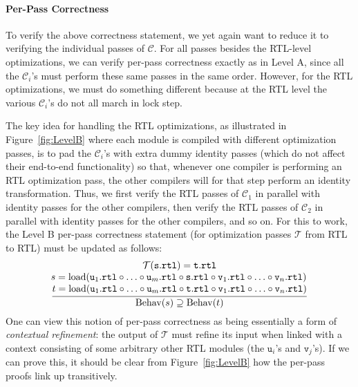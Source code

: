 \paragraph{Per-Pass Correctness}

To verify the above correctness statement, we yet again want to reduce
it to verifying the individual passes of $\mathcal{C}$.  For all passes
besides the RTL-level optimizations, we can verify per-pass
correctness exactly as in Level A, since all the $\mathcal{C}_i$'s must
perform these same passes in the same order.  However, for the RTL
optimizations, we must do something different because at the RTL level
the various $\mathcal{C}_i$'s do not all march in lock step.

The key idea for handling the RTL optimizations, as illustrated in Figure~\ref{fig:LevelB} where
each module is compiled with different optimization passes, is to pad the $\mathcal{C}_i$'s with
extra dummy identity passes (which do not affect their end-to-end functionality) so that, whenever
one compiler is performing an RTL optimization pass, the other compilers will for that step perform
an identity transformation.  Thus, we first verify the RTL passes of $\mathcal{C}_1$ in parallel
with identity passes for the other compilers, then verify the RTL passes of $\mathcal{C}_2$ in
parallel with identity passes for the other compilers, and so on.  For this to work, the Level B
per-pass correctness statement (for optimization passes $\mathcal{T}$ from RTL to RTL) must be
updated as follows:
\[
\frac{
\begin{array}{@{}c@{}}
\mathcal{T}(\mathtt{s.rtl}) = \mathtt{t.rtl} \\
\!s = \mathrm{load}(\mathtt{u}_1\mathtt{.rtl}\circ \ldots \circ \mathtt{u}_m\mathtt{.rtl}\circ\mathtt{s.rtl} \circ \mathtt{v}_1\mathtt{.rtl}\circ \ldots \circ \mathtt{v}_n\mathtt{.rtl})\\
t = \mathrm{load}(\mathtt{u}_1\mathtt{.rtl}\circ \ldots \circ \mathtt{u}_m\mathtt{.rtl}\circ\mathtt{t.rtl}\circ \mathtt{v}_1\mathtt{.rtl}\circ \ldots \circ \mathtt{v}_n\mathtt{.rtl})
\end{array}
}
{
\mathrm{Behav}(s) 
\supseteq \mathrm{Behav}(t)
}
\]
One can view this notion of per-pass correctness as being essentially
a form of \emph{contextual refinement}: the output of $\mathcal{T}$
must refine its input when linked with a context consisting of some
arbitrary other RTL modules (the $\mathtt{u}_i$'s and
$\mathtt{v}_j$'s).  If we can prove this, it should be clear from
Figure~\ref{fig:LevelB} how the per-pass proofs link up transitively.

